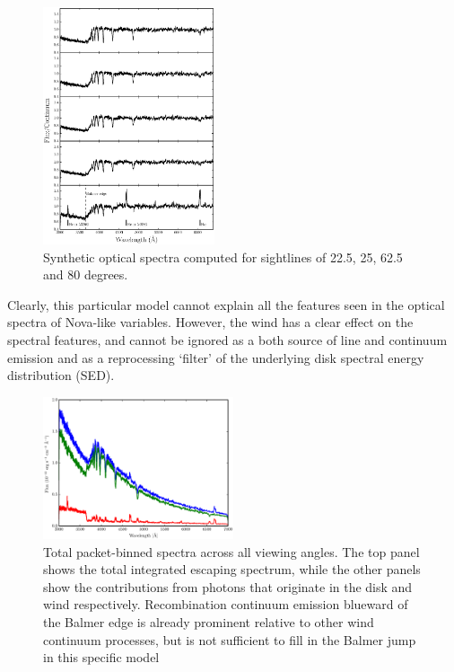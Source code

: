 \documentclass[preprint, a4paper, 11pt]{aastex}
\begin{document}
\begin{figure} 
\includegraphics[width=0.45\textwidth]{figures/fig6_opt_cont.eps}
\caption{Synthetic optical spectra computed for 
sightlines of 22.5, 25, 62.5 and 80 degrees.}
\label{spec_continuum}
\end{figure} 


Clearly, this particular model cannot explain all
the features seen in the optical spectra of Nova-like variables. However,
the wind has a clear effect on the spectral features, and cannot be ignored as 
a both source of line and continuum emission and as a reprocessing `filter'
of the underlying disk spectral energy distribution (SED).



\begin{figure} 
\includegraphics[width=0.5\textwidth]{figures/fig4.eps}
\caption{Total packet-binned spectra across all viewing angles. The top panel shows the total 
integrated escaping spectrum, while the other panels show the contributions from photons that originate
in the disk and wind respectively. Recombination continuum emission blueward of the Balmer 
edge is already prominent relative to other wind continuum processes, but is not sufficient
to fill in the Balmer jump in this specific model}
\label{cont}
\end{figure} 
\end{document}

